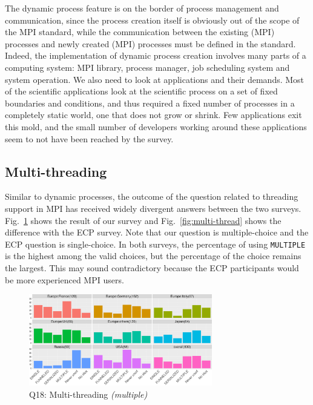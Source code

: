 \documentclass[preprint,5p,times]{elsarticle}
\def\myquote#1{{\it #1}}
\newcommand{\revision}[2]{{\color{blue}#2}}
\begin{document}
The dynamic process feature is on the border of process management and
communication, since the process creation itself is obviously out of the scope
of the MPI standard, while the communication between the existing (MPI)
processes and newly created (MPI) processes must be defined in the standard.
Indeed, the implementation of dynamic process creation \revision{spreads}{involves} many parts of a
computing system: MPI library, process manager, job scheduling system and system
operation.
%
We also need to look at applications and their demands. Most of the
scientific applications look at the scientific process on a set of fixed
boundaries and conditions, and thus required a fixed number of processes in a
completely static world, one that does not grow or shrink. Few applications exit
this mold, and the small number of developers working around these applications
seem to not have been reached by the survey.


\subsection{Multi-threading}\label{sec:mutil-threading}

Similar to dynamic processes, the outcome of the question related to threading
support in MPI has received widely divergent answers between the two surveys.
Fig.~\ref{fig:multi-thread-reg} shows the result of our survey and
Fig.~\ref{fig:multi-thread} shows the difference with the ECP survey. Note that
our question is multiple-choice and the ECP question is single-choice. In both
surveys, the percentage of using {\tt MULTIPLE} is the highest among the valid
choices, but the percentage of the choice \revision{\myquote{I don't know}}{\myquote{No idea}} remains the
largest. This may sound contradictory because the ECP participants would be more
experienced MPI users.

\begin{figure}[tb]
  \begin{center}
    \includegraphics[width=8.0cm]{R-scripts/Q18.pdf}
    \vspace{-1.5mm}
    \caption{Q18: Multi-threading {\it(multiple)}}
    \label{fig:multi-thread-reg}
\vspace{-3mm}%
  \end{center}
\end{figure}
\end{document}
